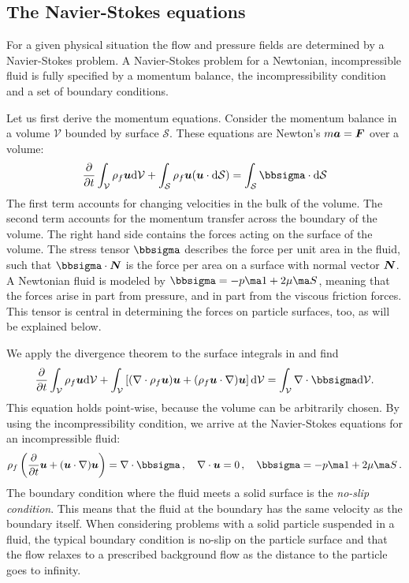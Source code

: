 \documentclass[thesis.tex]{subfiles}
\begin{document}
\subsection{The Navier-Stokes equations}

For a given physical situation the flow and pressure fields are determined by a Navier-Stokes problem.
A Navier-Stokes problem for a Newtonian, incompressible fluid is fully specified by a momentum balance, the incompressibility condition and a set of boundary conditions.

Let us first derive the momentum equations. Consider the momentum balance in a volume $\mathcal V$ bounded by surface $\mathcal S$. These equations are Newton's $m \mbox{\boldmath$a$} = \mbox{\boldmath$F$}$ over a volume:
\begin{align}
    \pdiff{}{t}\int_\mathcal V  \rho_f \ve u \rd\mathcal V +
    \int_\mathcal S \rho_f\ve u (\ve u \cdot \rd \mathcal S) =
    \int_\mathcal S \bbsigma \cdot \rd \mathcal S \eqnlab{nsderiv1}
\end{align}
The first term accounts for changing velocities in the bulk of the volume. The second term accounts for the momentum transfer across the boundary of the volume. The right hand side contains the forces acting on the surface of the volume. The stress tensor $\bbsigma$ describes the force per unit area in the fluid, such that $\bbsigma\cdot \ve N$ is the force per area on a surface with normal vector $\mbox{\boldmath$N$}$. A Newtonian fluid is modeled by $\bbsigma = -p \ma 1 + 2\mu \ma S$, meaning that the forces arise in part from pressure, and in part from the viscous friction forces. This tensor is central in determining the forces on particle surfaces, too, as will be explained below.

We apply the divergence theorem to the surface integrals in  and find
\begin{align}
    \pdiff{}{t}\int_\mathcal V  \rho_f \ve u \rd\mathcal V +
    \int_\mathcal V  \left[(\nabla\cdot\rho_f\ve u) \ve u+(\rho_f\ve u\cdot\nabla) \ve u\right] \rd \mathcal V =
    \int_\mathcal V \nabla\cdot\bbsigma \rd \mathcal V.
\end{align}
This equation holds point-wise, because the volume can be arbitrarily chosen. By using the incompressibility condition, we arrive at the Navier-Stokes equations for an incompressible fluid:
\begin{align}\eqnlab{nsintro}
    \rho_f \left(\pdiff{}{t}\ve u + (\ve u \cdot \nabla) \ve u\right)=\nabla \cdot \bbsigma\,,\quad \nabla \cdot \ve u = 0\,,\quad \bbsigma = -p \ma 1 + 2\mu \ma S\,.
\end{align}
The boundary condition where the fluid meets a solid surface is the \emph{no-slip condition}. This means that the fluid at the boundary has the same velocity as the boundary itself. When considering problems with a solid particle suspended in a fluid, the typical boundary condition is no-slip on the particle surface and that the flow relaxes to a prescribed background flow as the distance to the particle goes to infinity. 
\end{document}
